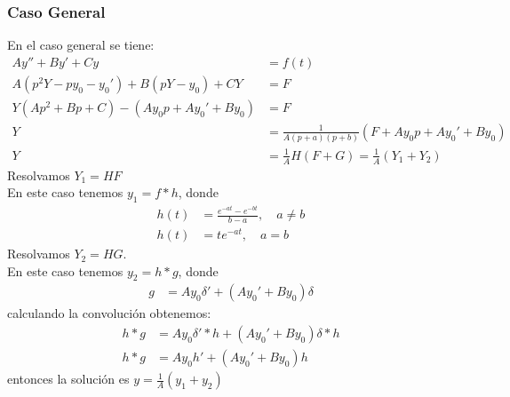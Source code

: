 \documentclass{article}
\begin{document}
\begin{tcolorbox}[breakable]
    \subsubsection*{Caso General}
    En el caso general se tiene:
    \begin{align*}
        Ay'' + By' + Cy &= f(t)\\
        A(p^2Y - py_0 - y_0') + B(pY - y_0) + CY &= F \\
        Y(Ap^2 + Bp + C) - (Ay_0p + Ay_0' + By_0) &= F \\
        Y &=\frac{1}{A(p+a)(p+b)}(F + Ay_0p + Ay_0' + By_0) \\
        Y &=\frac{1}{A}H(F + G) = \frac{1}{A} (Y_1 + Y_2) 
    \end{align*} 
    Resolvamos $Y_1 = HF$ \\ 
    En este caso tenemos $y_1 = f*h$, donde 
    \begin{align*}
        h(t) &=\frac{e^{-at} - e^{-bt}}{b-a},\quad a \neq b \\ 
        h(t) &=te^{-at},\quad a=b
    \end{align*}
    Resolvamos $Y_2 = HG$. \\
    En este caso tenemos $y_2 = h*g$, donde 
    \begin{align*}
        g &=Ay_0\delta' + (Ay_0' + By_0)\delta
    \end{align*}
    calculando la convolución obtenemos:
    \begin{align*}
        h*g &=Ay_0 \delta'*h + (Ay_0' + By_0) \delta*h \\
        h*g &=Ay_0h' + (Ay_0' + By_0)h
    \end{align*}
    entonces la solución es $y = \frac{1}{A} (y_1 + y_2)$

\end{tcolorbox}
\end{document}
